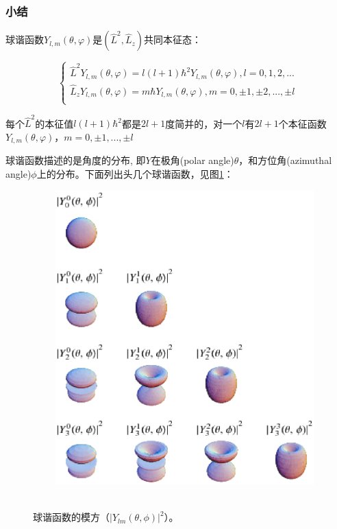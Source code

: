 \subsubsection*{小结}

球谐函数$Y_{l,m} \left( {\theta ,\varphi } \right)$是$\left( {\widehat L^2 ,\widehat L_z } \right)$共同本征态：

\begin{equation}
\left\{ \begin{array}{l}
 \widehat L^2 Y_{l,m} (\theta ,\varphi ) = l\left( {l + 1} \right)\hbar ^2 Y_{l,m} (\theta ,\varphi ),l = 0,1,2,... \\
 \widehat L_z Y_{l,m} (\theta ,\varphi ) = m\hbar Y_{l,m} (\theta ,\varphi ),m = 0, \pm 1, \pm 2,..., \pm l \\
 \end{array} \right.
\end{equation}

每个$\widehat L^2 $的本征值$l\left( {l + 1} \right)\hbar ^2 $都是$2l + 1$度简并的，对一个$l$有$2l+1$个本征函数$Y_{l,m} (\theta ,\varphi )$，$m = 0, \pm 1,..., \pm l$

球谐函数描述的是角度的分布, 即$Y$在极角(polar angle)$\theta$，和方位角(azimuthal angle)$\phi$上的分布。下面列出头几个球谐函数，见图\ref{spherical harmonics squared}：

\begin{figure}[h]
\begin{center}
  \includegraphics[width=10cm]{AngularMomentum/spherical_harmonics.ps}\\
  \caption{球谐函数的模方（$|Y_{lm}(\theta,\phi)|^2$）。}\label{spherical harmonics squared}
\end{center}
\end{figure}

